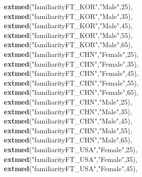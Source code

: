 \documentclass[
]{article}
\newenvironment{Shaded}{\begin{snugshade}}{\end{snugshade}}
\newcommand{\DecValTok}[1]{\textcolor[rgb]{0.00,0.00,0.81}{#1}}
\newcommand{\KeywordTok}[1]{\textcolor[rgb]{0.13,0.29,0.53}{\textbf{#1}}}
\newcommand{\NormalTok}[1]{#1}
\newcommand{\StringTok}[1]{\textcolor[rgb]{0.31,0.60,0.02}{#1}}
\begin{document}
\begin{Shaded}
\begin{Highlighting}[]
               \KeywordTok{extmed}\NormalTok{(}\StringTok{"familiarityFT_KOR"}\NormalTok{,}\StringTok{"Male"}\NormalTok{,}\DecValTok{25}\NormalTok{),}
               \KeywordTok{extmed}\NormalTok{(}\StringTok{"familiarityFT_KOR"}\NormalTok{,}\StringTok{"Male"}\NormalTok{,}\DecValTok{35}\NormalTok{),}
               \KeywordTok{extmed}\NormalTok{(}\StringTok{"familiarityFT_KOR"}\NormalTok{,}\StringTok{"Male"}\NormalTok{,}\DecValTok{45}\NormalTok{),}
               \KeywordTok{extmed}\NormalTok{(}\StringTok{"familiarityFT_KOR"}\NormalTok{,}\StringTok{"Male"}\NormalTok{,}\DecValTok{55}\NormalTok{),}
               \KeywordTok{extmed}\NormalTok{(}\StringTok{"familiarityFT_KOR"}\NormalTok{,}\StringTok{"Male"}\NormalTok{,}\DecValTok{65}\NormalTok{),}
               \KeywordTok{extmed}\NormalTok{(}\StringTok{"familiarityFT_CHN"}\NormalTok{,}\StringTok{"Female"}\NormalTok{,}\DecValTok{25}\NormalTok{),}
               \KeywordTok{extmed}\NormalTok{(}\StringTok{"familiarityFT_CHN"}\NormalTok{,}\StringTok{"Female"}\NormalTok{,}\DecValTok{35}\NormalTok{),}
               \KeywordTok{extmed}\NormalTok{(}\StringTok{"familiarityFT_CHN"}\NormalTok{,}\StringTok{"Female"}\NormalTok{,}\DecValTok{45}\NormalTok{),}
               \KeywordTok{extmed}\NormalTok{(}\StringTok{"familiarityFT_CHN"}\NormalTok{,}\StringTok{"Female"}\NormalTok{,}\DecValTok{55}\NormalTok{),}
               \KeywordTok{extmed}\NormalTok{(}\StringTok{"familiarityFT_CHN"}\NormalTok{,}\StringTok{"Female"}\NormalTok{,}\DecValTok{65}\NormalTok{),}
               \KeywordTok{extmed}\NormalTok{(}\StringTok{"familiarityFT_CHN"}\NormalTok{,}\StringTok{"Male"}\NormalTok{,}\DecValTok{25}\NormalTok{),}
               \KeywordTok{extmed}\NormalTok{(}\StringTok{"familiarityFT_CHN"}\NormalTok{,}\StringTok{"Male"}\NormalTok{,}\DecValTok{35}\NormalTok{),}
               \KeywordTok{extmed}\NormalTok{(}\StringTok{"familiarityFT_CHN"}\NormalTok{,}\StringTok{"Male"}\NormalTok{,}\DecValTok{45}\NormalTok{),}
               \KeywordTok{extmed}\NormalTok{(}\StringTok{"familiarityFT_CHN"}\NormalTok{,}\StringTok{"Male"}\NormalTok{,}\DecValTok{55}\NormalTok{),}
               \KeywordTok{extmed}\NormalTok{(}\StringTok{"familiarityFT_CHN"}\NormalTok{,}\StringTok{"Male"}\NormalTok{,}\DecValTok{65}\NormalTok{),}
               \KeywordTok{extmed}\NormalTok{(}\StringTok{"familiarityFT_USA"}\NormalTok{,}\StringTok{"Female"}\NormalTok{,}\DecValTok{25}\NormalTok{),}
               \KeywordTok{extmed}\NormalTok{(}\StringTok{"familiarityFT_USA"}\NormalTok{,}\StringTok{"Female"}\NormalTok{,}\DecValTok{35}\NormalTok{),}
               \KeywordTok{extmed}\NormalTok{(}\StringTok{"familiarityFT_USA"}\NormalTok{,}\StringTok{"Female"}\NormalTok{,}\DecValTok{45}\NormalTok{),}

\end{Highlighting}
\end{Shaded}
\end{document}
